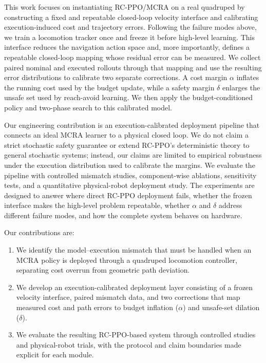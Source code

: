 \documentclass{article}
\begin{document}
This work focuses on instantiating RC-PPO/MCRA on a real quadruped by constructing
a fixed and repeatable closed-loop velocity interface and calibrating
execution-induced cost and trajectory errors. Following the failure modes above,
we train a locomotion tracker once and freeze it before high-level learning. This
interface reduces the navigation action space and, more importantly, defines a
repeatable closed-loop mapping whose residual error can be measured. We collect
paired nominal and executed rollouts through that mapping and use the resulting
error distributions to calibrate two separate corrections. A cost margin $\alpha$
inflates the running cost used by the budget update, while a safety margin
$\delta$ enlarges the unsafe set used by reach-avoid learning. We then apply the
budget-conditioned policy and two-phase search to this calibrated model.

Our engineering contribution is an execution-calibrated deployment pipeline that
connects an ideal MCRA learner to a physical closed loop. We do not claim a strict
stochastic safety guarantee or extend RC-PPO's deterministic theory to general
stochastic systems; instead, our claims are limited to empirical robustness under
the execution distribution used to calibrate the margins. We evaluate the pipeline
with controlled mismatch studies, component-wise ablations, sensitivity tests, and
a quantitative physical-robot deployment study. The experiments are designed to
answer where direct RC-PPO deployment fails, whether the frozen interface makes
the high-level problem repeatable, whether $\alpha$ and $\delta$ address different
failure modes, and how the complete system behaves on hardware.

Our contributions are:
\begin{enumerate}
\item We identify the model--execution mismatch that must be handled when an
      MCRA policy is deployed through a quadruped locomotion controller, separating
      cost overrun from geometric path deviation.
\item We develop an execution-calibrated deployment layer consisting of a frozen
      velocity interface, paired mismatch data, and two corrections that map
      measured cost and path errors to budget inflation ($\alpha$) and unsafe-set
      dilation ($\delta$).
\item We evaluate the resulting RC-PPO-based system through controlled studies and
      physical-robot trials, with the protocol and claim boundaries made explicit
      for each module.
\end{enumerate}
\end{document}
